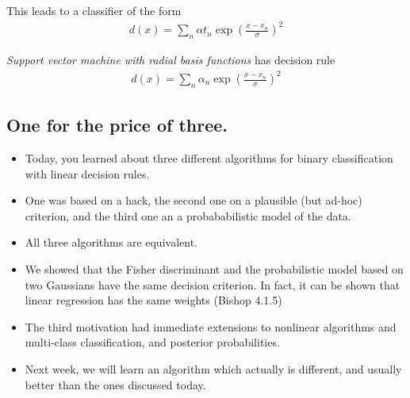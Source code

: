 This leads to a classifier of the form
\begin{align}
	d(x)= \sum_{n} \alpha  t_n \exp\left( \frac{x-x_n}{\sigma}\right)^2
\end{align}

\emph{Support vector machine with radial basis functions} has decision rule 
\begin{align}
	d(x)=\sum_{n}  \alpha_n \exp\left( \frac{x-x_n}{\sigma}\right)^2
\end{align}





\subsection{One for the price of three.} 
\begin{itemize}
	\item Today, you learned about three different algorithms for binary classification with linear decision rules. 
	\item  One was based on a hack, the second one on a plausible (but ad-hoc) criterion, and the third one an a probababilistic model of the data.
	\item  All three algorithms are equivalent.
	\item  We showed that the Fisher discriminant and the probabilistic model based on two Gaussians have the same  decision criterion. In fact, it can be shown that linear regression has the same weights (Bishop 4.1.5)
	\item The third motivation had immediate extensions to nonlinear algorithms and multi-class classification, and posterior probabilities.
	\item  Next week, we will learn an algorithm which actually is different, and usually better than the ones discussed today.
\end{itemize}

